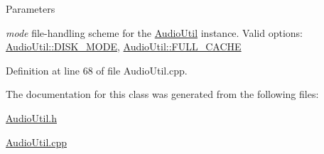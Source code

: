 \begin{DoxyParams}{Parameters}
\item[{\em mode}]file-\/handling scheme for the \hyperlink{classAudioUtil}{AudioUtil} instance. Valid options: \hyperlink{}{AudioUtil::DISK\_\-MODE}, \hyperlink{}{AudioUtil::FULL\_\-CACHE} \end{DoxyParams}


Definition at line 68 of file AudioUtil.cpp.

The documentation for this class was generated from the following files:\begin{DoxyCompactItemize}
\item 
\hyperlink{AudioUtil_8h}{AudioUtil.h}\item 
\hyperlink{AudioUtil_8cpp}{AudioUtil.cpp}\end{DoxyCompactItemize}
